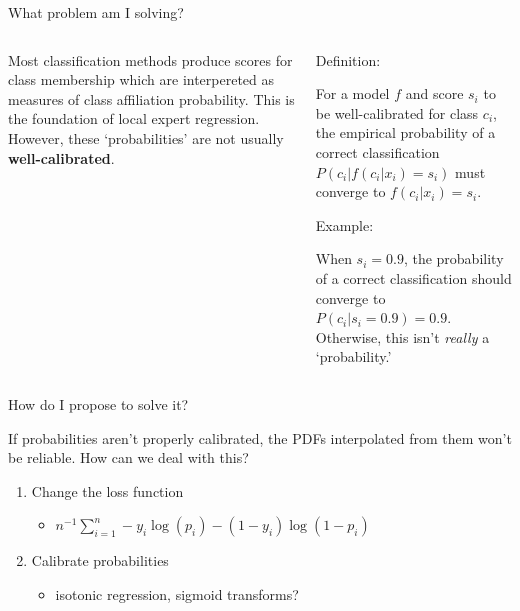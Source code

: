 \documentclass[ignorenonframetext,]{beamer}
\providecommand{\tightlist}{%
\setlength{\itemsep}{0pt}\setlength{\parskip}{0pt}}
\begin{document}
\begin{frame}{What problem am I solving?}

\begin{columns}
\begin{column}{0.48\textwidth}

Most classification methods produce scores for class membership which are interpereted as measures of class affiliation probability. This is the foundation of local expert regression. However, these `probabilities' are not usually \textbf{well-calibrated}. 

\end{column}


\begin{column}{0.48\textwidth}
\begin{block}{Definition:}

For a model $f$ and score $s_i$ to be well-calibrated for class $c_i$, the empirical probability of a correct classification $P(c_i | f( c_i | x_i)=s_i)$ must converge to $f(c_i | x_i) = s_i$.

\end{block}
\begin{block}{Example:}

When $s_i = 0.9$, the probability of a correct classification should converge to $P(c_i | s_i = 0.9) = 0.9$. Otherwise, this isn't \textit{really} a `probability.'

\end{block}
\end{column}
\end{columns}

\end{frame}

\begin{frame}{How do I propose to solve it?}

\begin{block}{If probabilities aren't properly calibrated, the PDFs
interpolated from them won't be reliable. How can we deal with this?}

\begin{enumerate}
\def\labelenumi{\arabic{enumi}.}
\tightlist
\item
  Change the loss function

  \begin{itemize}
  \tightlist
  \item
    \(n^{-1}\sum_{i=1}^{n}-y_i\log(p_i)-(1-y_i)\log(1-p_i)\)
  \end{itemize}
\item
  Calibrate probabilities

  \begin{itemize}
  \tightlist
  \item
    isotonic regression, sigmoid transforms?
  \end{itemize}
\end{enumerate}

\end{block}

\end{frame}
\end{document}
